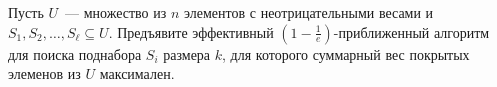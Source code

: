 Пусть $U$~--- множество из $n$ элементов с неотрицательными весами и $S_1, S_2, \dots, S_{\ell} \subseteq
U$. Предъявите эффективный $\left(1 - \frac{1}{e}\right)$-приближенный алгоритм для поиска поднабора
$S_i$ размера $k$, для которого суммарный вес покрытых элеменов из $U$ максимален.